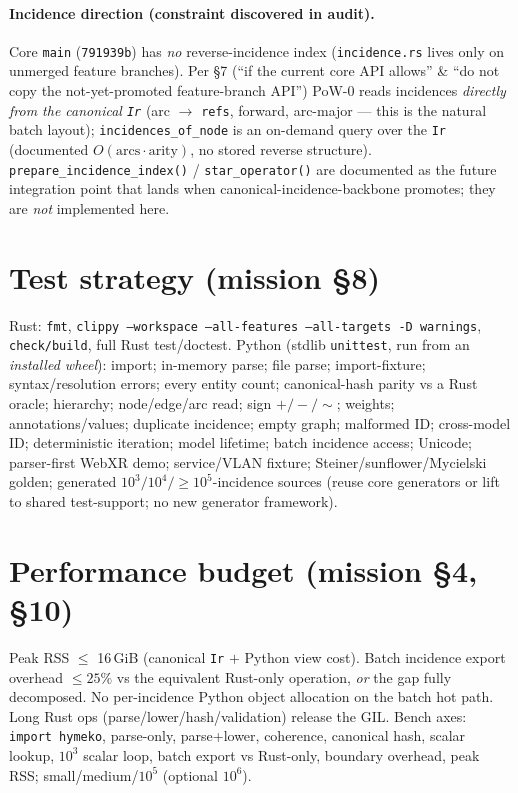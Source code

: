 \documentclass[11pt]{article}
\begin{document}
\paragraph{Incidence direction (constraint discovered in audit).} Core \texttt{main}
(\texttt{791939b}) has \emph{no} reverse-incidence index (\texttt{incidence.rs} lives only on
unmerged feature branches). Per \S7 (``if the current core API allows'' \& ``do not copy the
not-yet-promoted feature-branch API'') PoW-0 reads incidences \emph{directly from the canonical
\texttt{Ir}} (arc $\to$ \texttt{refs}, forward, arc-major --- this is the natural batch layout);
\texttt{incidences\_of\_node} is an on-demand query over the \texttt{Ir} (documented $O(\text{arcs}\cdot\text{arity})$,
no stored reverse structure). \texttt{prepare\_incidence\_index()} / \texttt{star\_operator()}
are documented as the future integration point that lands when canonical-incidence-backbone
promotes; they are \emph{not} implemented here.

\section{Test strategy (mission \S8)}
Rust: \texttt{fmt}, \texttt{clippy --workspace --all-features --all-targets -D warnings},
\texttt{check/build}, full Rust test/doctest. Python (stdlib \texttt{unittest}, run from an
\emph{installed wheel}): import; in-memory parse; file parse; import-fixture; syntax/resolution
errors; every entity count; canonical-hash parity vs a Rust oracle; hierarchy; node/edge/arc
read; sign $+/-/\sim$; weights; annotations/values; duplicate incidence; empty graph;
malformed ID; cross-model ID; deterministic iteration; model lifetime; batch incidence access;
Unicode; parser-first WebXR demo; service/VLAN fixture; Steiner/sunflower/Mycielski golden;
generated $10^3/10^4/\ge 10^5$-incidence sources (reuse core generators or lift to shared
test-support; no new generator framework).

\section{Performance budget (mission \S4, \S10)}
Peak RSS $\le$ 16\,GiB (canonical \texttt{Ir} $+$ Python view cost). Batch incidence export
overhead $\le 25\%$ vs the equivalent Rust-only operation, \emph{or} the gap fully decomposed.
No per-incidence Python object allocation on the batch hot path. Long Rust ops
(parse/lower/hash/validation) release the GIL. Bench axes: \texttt{import hymeko}, parse-only,
parse+lower, coherence, canonical hash, scalar lookup, $10^3$ scalar loop, batch export vs
Rust-only, boundary overhead, peak RSS; small/medium/$10^5$ (optional $10^6$).
\end{document}
